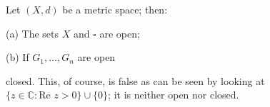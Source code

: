 Let $(X, d)$ be a metric space; then:

(a) The sets $X$ and $\square$ are open;

(b) If $G_1, \ldots, G_n$ are open

closed. This, of course, is false as can be seen by looking at $\{z \in \mathbb{C} : \text{Re } z > 0\} \cup \{0\}$; it is neither open nor closed.